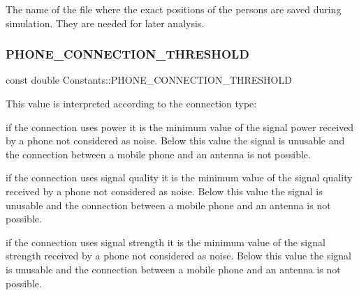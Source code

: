 The name of the file where the exact positions of the persons are saved during simulation. They are needed for later analysis. \mbox{\label{class_constants_a1cbf0a4e111b9d2e13b33e771a342b4f}} 
\subsubsection{\texorpdfstring{P\+H\+O\+N\+E\+\_\+\+C\+O\+N\+N\+E\+C\+T\+I\+O\+N\+\_\+\+T\+H\+R\+E\+S\+H\+O\+LD}{PHONE\_CONNECTION\_THRESHOLD}}
{\footnotesize\ttfamily const double Constants\+::\+P\+H\+O\+N\+E\+\_\+\+C\+O\+N\+N\+E\+C\+T\+I\+O\+N\+\_\+\+T\+H\+R\+E\+S\+H\+O\+LD\hspace{0.3cm}{\ttfamily [static]}}

This value is interpreted according to the connection type\+:
\begin{DoxyItemize}
\item if the connection uses power it is the minimum value of the signal power received by a phone not considered as noise. Below this value the signal is unusable and the connection between a mobile phone and an antenna is not possible.
\item if the connection uses signal quality it is the minimum value of the signal quality received by a phone not considered as noise. Below this value the signal is unusable and the connection between a mobile phone and an antenna is not possible.
\item if the connection uses signal strength it is the minimum value of the signal strength received by a phone not considered as noise. Below this value the signal is unusable and the connection between a mobile phone and an antenna is not possible. 
\end{DoxyItemize}\mbox{\label{class_constants_a1e95cbdc2db02f6147ddf8ac61a428ab}} 

